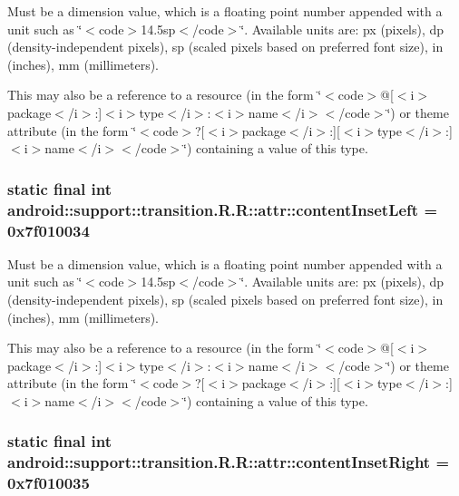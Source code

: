 Must be a dimension value, which is a floating point number appended with a unit such as \char`\"{}$<$code$>$14.5sp$<$/code$>$\char`\"{}. Available units are: px (pixels), dp (density-independent pixels), sp (scaled pixels based on preferred font size), in (inches), mm (millimeters). 

This may also be a reference to a resource (in the form \char`\"{}$<$code$>$@\mbox{[}$<$i$>$package$<$/i$>$:\mbox{]}$<$i$>$type$<$/i$>$:$<$i$>$name$<$/i$>$$<$/code$>$\char`\"{}) or theme attribute (in the form \char`\"{}$<$code$>$?\mbox{[}$<$i$>$package$<$/i$>$:\mbox{]}\mbox{[}$<$i$>$type$<$/i$>$:\mbox{]}$<$i$>$name$<$/i$>$$<$/code$>$\char`\"{}) containing a value of this type. \hypertarget{classandroid_1_1support_1_1transition_1_1_r_1_1attr_5abb710c1a82df6c9c172201d6c8a80f}{
\subsubsection[{contentInsetLeft}]{\setlength{\rightskip}{0pt plus 5cm}static final int android::support::transition.R.R::attr::contentInsetLeft = 0x7f010034}}
\label{classandroid_1_1support_1_1transition_1_1_r_1_1attr_5abb710c1a82df6c9c172201d6c8a80f}


Must be a dimension value, which is a floating point number appended with a unit such as \char`\"{}$<$code$>$14.5sp$<$/code$>$\char`\"{}. Available units are: px (pixels), dp (density-independent pixels), sp (scaled pixels based on preferred font size), in (inches), mm (millimeters). 

This may also be a reference to a resource (in the form \char`\"{}$<$code$>$@\mbox{[}$<$i$>$package$<$/i$>$:\mbox{]}$<$i$>$type$<$/i$>$:$<$i$>$name$<$/i$>$$<$/code$>$\char`\"{}) or theme attribute (in the form \char`\"{}$<$code$>$?\mbox{[}$<$i$>$package$<$/i$>$:\mbox{]}\mbox{[}$<$i$>$type$<$/i$>$:\mbox{]}$<$i$>$name$<$/i$>$$<$/code$>$\char`\"{}) containing a value of this type. \hypertarget{classandroid_1_1support_1_1transition_1_1_r_1_1attr_3b4af189835d4fc21de3fd1dede94296}{
\subsubsection[{contentInsetRight}]{\setlength{\rightskip}{0pt plus 5cm}static final int android::support::transition.R.R::attr::contentInsetRight = 0x7f010035}}
\label{classandroid_1_1support_1_1transition_1_1_r_1_1attr_3b4af189835d4fc21de3fd1dede94296}


